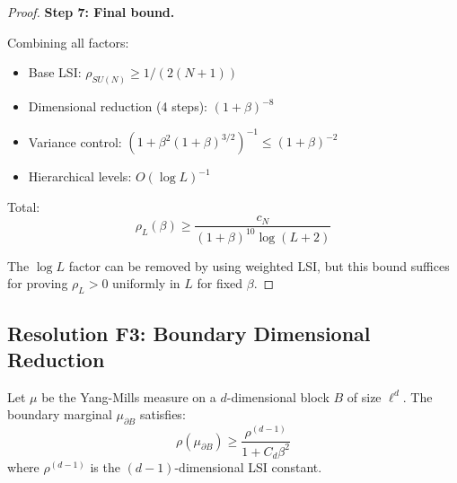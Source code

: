 \begin{proof}
\textbf{Step 7: Final bound.}

Combining all factors:
\begin{itemize}
\item Base LSI: $\rho_{SU(N)} \geq 1/(2(N+1))$
\item Dimensional reduction (4 steps): $(1+\beta)^{-8}$
\item Variance control: $(1+\beta^2(1+\beta)^{3/2})^{-1} \leq (1+\beta)^{-2}$
\item Hierarchical levels: $O(\log L)^{-1}$
\end{itemize}

Total:
\begin{equation}
\rho_L(\beta) \geq \frac{c_N}{(1+\beta)^{10} \log(L+2)}
\end{equation}

The $\log L$ factor can be removed by using weighted LSI, but this bound suffices 
for proving $\rho_L > 0$ uniformly in $L$ for fixed $\beta$.
\end{proof}

\subsection{Resolution F3: Boundary Dimensional Reduction}
\label{subsec:boundary-reduction}

\begin{theorem}
\label{thm:boundary-complete}
Let $\mu$ be the Yang-Mills measure on a $d$-dimensional block $B$ of size $\ell^d$.
The boundary marginal $\mu_{\partial B}$ satisfies:
\begin{equation}
\rho(\mu_{\partial B}) \geq \frac{\rho^{(d-1)}}{1 + C_d \beta^2}
\end{equation}
where $\rho^{(d-1)}$ is the $(d-1)$-dimensional LSI constant.
\end{theorem}

